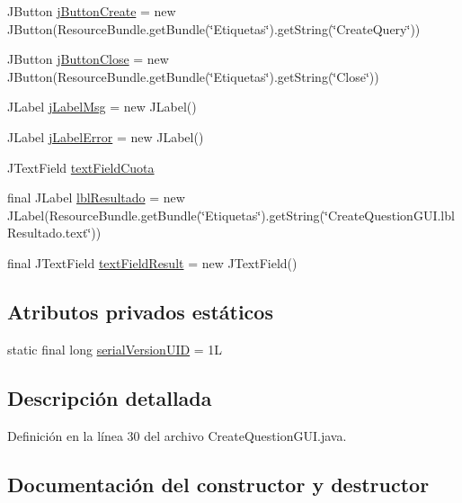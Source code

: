 \begin{DoxyCompactItemize}
\item 
J\+Button \mbox{\hyperlink{classgui_1_1CreateQuestionGUI_ab63c4d45270efeffdb0137a8be0163bb}{j\+Button\+Create}} = new J\+Button(Resource\+Bundle.\+get\+Bundle(\char`\"{}Etiquetas\char`\"{}).get\+String(\char`\"{}Create\+Query\char`\"{}))
\item 
J\+Button \mbox{\hyperlink{classgui_1_1CreateQuestionGUI_ab06cd5dc6f37bc2ded45ff7b29bc18f9}{j\+Button\+Close}} = new J\+Button(Resource\+Bundle.\+get\+Bundle(\char`\"{}Etiquetas\char`\"{}).get\+String(\char`\"{}Close\char`\"{}))
\item 
J\+Label \mbox{\hyperlink{classgui_1_1CreateQuestionGUI_ad0c2eb3eb7eefc996d684ddab25decf0}{j\+Label\+Msg}} = new J\+Label()
\item 
J\+Label \mbox{\hyperlink{classgui_1_1CreateQuestionGUI_a1cb82bebfab8f827f7ef9cc7f62db11d}{j\+Label\+Error}} = new J\+Label()
\item 
J\+Text\+Field \mbox{\hyperlink{classgui_1_1CreateQuestionGUI_a78b0906d852838d49df52e2b407462bf}{text\+Field\+Cuota}}
\item 
final J\+Label \mbox{\hyperlink{classgui_1_1CreateQuestionGUI_aa8b6309e7e7f51e35da8339e0170ca96}{lbl\+Resultado}} = new J\+Label(Resource\+Bundle.\+get\+Bundle(\char`\"{}Etiquetas\char`\"{}).get\+String(\char`\"{}Create\+Question\+G\+U\+I.\+lbl\+Resultado.\+text\char`\"{}))
\item 
final J\+Text\+Field \mbox{\hyperlink{classgui_1_1CreateQuestionGUI_a4bedcfd1ede339a0bd85ae899b1dd3e2}{text\+Field\+Result}} = new J\+Text\+Field()
\end{DoxyCompactItemize}
\subsection*{Atributos privados estáticos}
\begin{DoxyCompactItemize}
\item 
static final long \mbox{\hyperlink{classgui_1_1CreateQuestionGUI_a8fb77e14fbe05d7368fabf0a88575184}{serial\+Version\+U\+ID}} = 1L
\end{DoxyCompactItemize}


\subsection{Descripción detallada}


Definición en la línea 30 del archivo Create\+Question\+G\+U\+I.\+java.



\subsection{Documentación del constructor y destructor}
\mbox{\label{classgui_1_1CreateQuestionGUI_aebd0e09c3e2f3ee4bc383d99124171d1}} 
